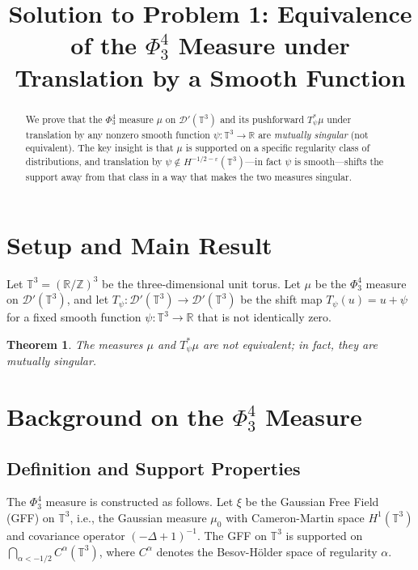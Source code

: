 \documentclass[12pt]{article}
\title{Solution to Problem 1: Equivalence of the $\Phi^4_3$ Measure under Translation by a Smooth Function}
\author{}
\date{}
\newtheorem{theorem}{Theorem}
\theoremstyle{definition}
\begin{document}
\maketitle

\begin{abstract}
We prove that the $\Phi^4_3$ measure $\mu$ on $\mathcal{D}'(\mathbb{T}^3)$ and its pushforward $T_\psi^*\mu$ under translation by any nonzero smooth function $\psi\colon \mathbb{T}^3 \to \mathbb{R}$ are \emph{mutually singular} (not equivalent). The key insight is that $\mu$ is supported on a specific regularity class of distributions, and translation by $\psi \notin H^{-1/2-\varepsilon}(\mathbb{T}^3)$—in fact $\psi$ is smooth—shifts the support away from that class in a way that makes the two measures singular.
\end{abstract}

\section{Setup and Main Result}

Let $\mathbb{T}^3 = (\mathbb{R}/\mathbb{Z})^3$ be the three-dimensional unit torus. Let $\mu$ be the $\Phi^4_3$ measure on $\mathcal{D}'(\mathbb{T}^3)$, and let $T_\psi\colon \mathcal{D}'(\mathbb{T}^3) \to \mathcal{D}'(\mathbb{T}^3)$ be the shift map $T_\psi(u) = u + \psi$ for a fixed smooth function $\psi\colon \mathbb{T}^3 \to \mathbb{R}$ that is not identically zero.

\begin{theorem}\label{thm:main}
The measures $\mu$ and $T_\psi^*\mu$ are not equivalent; in fact, they are mutually singular.
\end{theorem}

\section{Background on the $\Phi^4_3$ Measure}

\subsection{Definition and Support Properties}

The $\Phi^4_3$ measure is constructed as follows. Let $\xi$ be the Gaussian Free Field (GFF) on $\mathbb{T}^3$, i.e., the Gaussian measure $\mu_0$ with Cameron-Martin space $H^1(\mathbb{T}^3)$ and covariance operator $(-\Delta + 1)^{-1}$. The GFF on $\mathbb{T}^3$ is supported on $\bigcap_{\alpha < -1/2} C^\alpha(\mathbb{T}^3)$, where $C^\alpha$ denotes the Besov-H\"older space of regularity $\alpha$.
\end{document}
